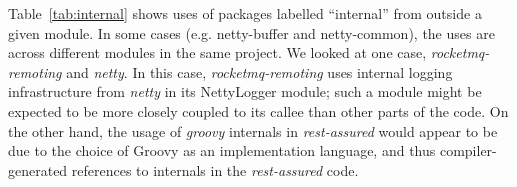 Table~\ref{tab:internal} shows uses of packages labelled ``internal'' from outside
a given module. In some cases (e.g. netty-buffer and netty-common),
the uses are across different modules in the same project. We looked
at one case, \emph{rocketmq-remoting} and \emph{netty}. In this case,
\emph{rocketmq-remoting} uses internal logging infrastructure from
\emph{netty} in its NettyLogger module; such a module might be
expected to be more closely coupled to its callee than other parts of
the code. On the other hand, the usage of \emph{groovy} internals in
\emph{rest-assured} would appear to be due to the choice of Groovy as
an implementation language, and thus compiler-generated references to
internals in the \emph{rest-assured} code.






